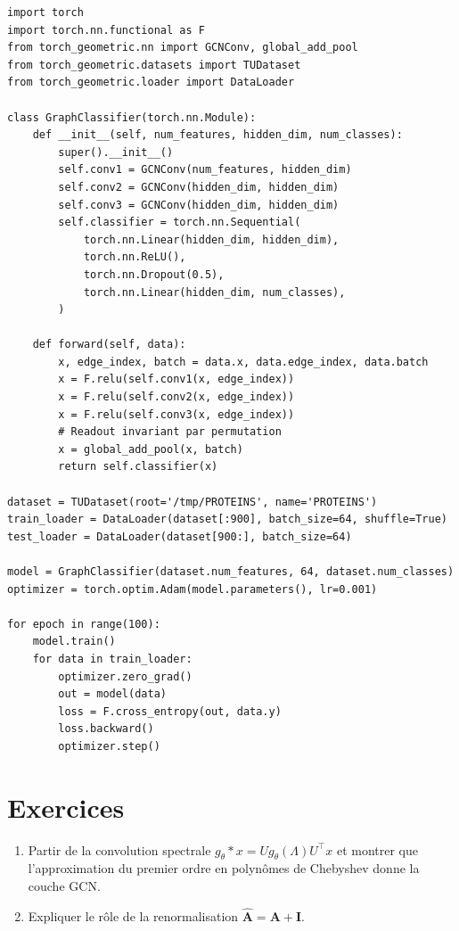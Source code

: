 \begin{codeblock}[title=\textbf{Classification de graphes mol\'eculaires}]
\begin{verbatim}
import torch
import torch.nn.functional as F
from torch_geometric.nn import GCNConv, global_add_pool
from torch_geometric.datasets import TUDataset
from torch_geometric.loader import DataLoader

class GraphClassifier(torch.nn.Module):
    def __init__(self, num_features, hidden_dim, num_classes):
        super().__init__()
        self.conv1 = GCNConv(num_features, hidden_dim)
        self.conv2 = GCNConv(hidden_dim, hidden_dim)
        self.conv3 = GCNConv(hidden_dim, hidden_dim)
        self.classifier = torch.nn.Sequential(
            torch.nn.Linear(hidden_dim, hidden_dim),
            torch.nn.ReLU(),
            torch.nn.Dropout(0.5),
            torch.nn.Linear(hidden_dim, num_classes),
        )

    def forward(self, data):
        x, edge_index, batch = data.x, data.edge_index, data.batch
        x = F.relu(self.conv1(x, edge_index))
        x = F.relu(self.conv2(x, edge_index))
        x = F.relu(self.conv3(x, edge_index))
        # Readout invariant par permutation
        x = global_add_pool(x, batch)
        return self.classifier(x)

dataset = TUDataset(root='/tmp/PROTEINS', name='PROTEINS')
train_loader = DataLoader(dataset[:900], batch_size=64, shuffle=True)
test_loader = DataLoader(dataset[900:], batch_size=64)

model = GraphClassifier(dataset.num_features, 64, dataset.num_classes)
optimizer = torch.optim.Adam(model.parameters(), lr=0.001)

for epoch in range(100):
    model.train()
    for data in train_loader:
        optimizer.zero_grad()
        out = model(data)
        loss = F.cross_entropy(out, data.y)
        loss.backward()
        optimizer.step()
\end{verbatim}
\end{codeblock}

\section*{Exercices}

\begin{exercice}
\begin{enumerate}
    \item Partir de la convolution spectrale $g_\theta * x = U g_\theta(\Lambda) U^\top x$
          et montrer que l'approximation du premier ordre en polyn\^omes de
          Chebyshev donne la couche GCN.
    \item Expliquer le r\^ole de la renormalisation $\hat{\mathbf{A}} = \mathbf{A} + \mathbf{I}$.
\end{enumerate}
\end{exercice}

